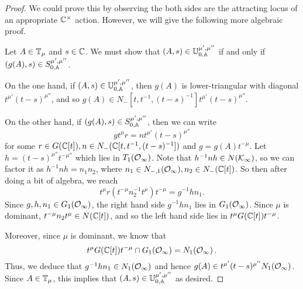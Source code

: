 \documentclass[draft]{article}
\begin{document}
% 
% 
% 

\begin{proof}
We could prove this by observing the both sides are the attracting locus of an appropriate $ \CC^\times$ action. However, we will give the following more algebraic proof.

Let $ A \in \TT_\mu$ and $ s \in \CC $. We must show that  $ (A,s) \in \UU^{\mu', \mu''}_{0,\AA} $ if and only if $ (g(A),s) \in S^{\mu', \mu''}_{0,\AA} $.

On the one hand, if $ (A,s) \in \UU^{\mu', \mu''}_{0,\AA} $, then $ g(A)$ is lower-triangular with diagonal $ t^{\mu'} (t-s)^{\mu''}$, and so $ g(A) \in N_-[t, t^{-1}, (t-s)^{-1}] t^{\mu'} (t-s)^{\mu''}$. 

On the other hand, if $ (g(A), s) \in S^{\mu', \mu''}_{0,\AA}$, then we can write 
$$
g t^\mu r= n t^{\mu'} (t-s)^{\mu''}
$$
for some $ r \in G(\CC[t]), n \in N_-(\CC[t, t^{-1}, (t-s)^{-1}]) $ and $ g = g(A)t^{-\mu}$.  Let $ h = (t-s)^{\mu''} t^{-\mu''}$ which lies in $ T_1(\Oinf) $. %
Note that $ h^{-1}n h \in N(\Kinf)$, 
so we can factor it as $ h^{-1} n h  = n_1 n_2 $, where $ n_1 \in N_{-,1}(\Oinf), n_2 \in N_-(\CC[t])$.  So then after doing a bit of algebra, we reach
$$
t^\mu r (t^{-\mu} n_2^{-1} t^\mu) t^{-\mu} = g^{-1} h n_1.
$$
Since $ g, h, n_1 \in G_1(\Oinf)$, the right hand side $ g^{-1} h n_1 $ lies in $ G_1(\Oinf) $.  Since $ \mu $ is dominant, $ t^{-\mu} n_2 t^\mu \in N(\CC[t])$, and so the left hand side lies in $t^\mu G(\CC[t]) t^{-\mu}$.

Moreover, since $ \mu $ is dominant, we know that 
$$t^\mu G(\CC[t]) t^{-\mu} \cap G_1(\Oinf) = N_1(\Oinf)\,.$$
Thus, we deduce that $ g^{-1} h n_1 \in N_1(\Oinf)$ 
and hence $ g(A) \in t^{\mu'} (t-s)^{\mu''} N_1(\Oinf) $.  
Since $ A \in \TT_\mu $, this implies that $ (A,s) \in \UU^{\mu', \mu''}_{0,\AA}$ as desired.
\end{proof}
\end{document}
